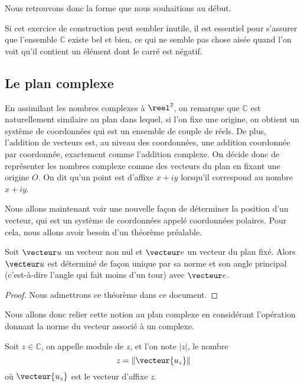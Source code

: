 Nous retrouvons donc la forme que nous souhaitions au début.

Si cet exercice de construction peut sembler inutile, il est essentiel pour s'assurer que l'ensemble $\mathbb C$ existe bel et bien, ce qui ne semble pas chose aisée quand l'on voit qu'il contient un élément dont le carré est négatif.

\subsection{Le plan complexe}

En assimilant les nombres complexes à $\reel^2$, on remarque que $\mathbb C$ est naturellement similaire au plan dans lequel, si l'on fixe une origine, on obtient un système de coordonnées qui est un ensemble de couple de réels. De plus, l'addition de vecteurs est, au niveau des coordonnées, une addition coordonnée par coordonnée, exactement comme l'addition complexe. On décide donc de représenter les nombres complexe comme des vecteurs du plan en fixant une origine $O$. On dit qu'un point est d'affixe $x+iy$ lorsqu'il correspond au nombre $x+iy$.


Nous allons maintenant voir une nouvelle façon de déterminer la position d'un vecteur, qui est un système de coordonnées appelé coordonnées polaires. Pour cela, nous allons avoir besoin d'un théorème préalable.

\begin{them}
    Soit $\vecteur u$ un vecteur non nul et $\vecteur e$ un vecteur du plan fixé. Alors $\vecteur u$ est déterminé de façon unique par sa norme et son angle principal (c'est-à-dire l'angle qui fait moins d'un tour) avec $\vecteur e$.
\end{them}
\begin{proof}
    Nous admettrons ce théorème dans ce document.
\end{proof}

Nous allons donc relier cette notion au plan complexe en considérant l'opération donnant la norme du vecteur associé à un complexe.

\begin{defi}[Module]
    Soit $z\in\mathbb C$, on appelle module de $z$, et l'on note $|z|$, le nombre $$z=\|\vecteur {u_z}\|$$ où $\vecteur {u_z}$ est le vecteur d'affixe $z$.
\end{defi}

